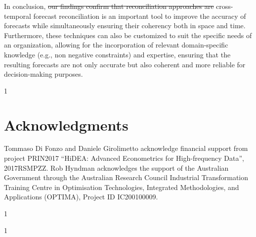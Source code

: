 \documentclass[review, 11pt]{elsarticle}
\newcommand{\blind}{1}
\theoremstyle{definition}
\begin{document}

In conclusion, {\color{red}\sout{our findings confirm that reconciliation approaches are}} {\color{blue}cross-temporal forecast reconciliation is} an important tool to improve the accuracy of forecasts while simultaneously ensuring their coherency both in space and time. Furthermore, these techniques can also be customized to suit the specific needs of an organization, allowing for the incorporation of relevant domain-specific knowledge (e.g., non negative constraints) and expertise, ensuring that the resulting forecasts are not only accurate but also coherent and more reliable for decision-making purposes.


\blind
{
\section*{Acknowledgments}

\noindent Tommaso Di Fonzo and Daniele Girolimetto acknowledge financial support from project PRIN2017 “HiDEA: Advanced Econometrics for High-frequency Data”, 2017RSMPZZ. Rob Hyndman acknowledges the support of the Australian Government through the Australian Research Council Industrial Transformation Training Centre in Optimisation Technologies, Integrated Methodologies, and Applications (OPTIMA), Project ID IC200100009.
} \fi

\begingroup
{}
\setlength{\bibsep}{0pt plus 0.3ex}


\blind
{

} \fi

\blind
{

} \fi

\endgroup

\newpage
\end{document}
